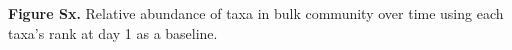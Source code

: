 \textbf{Figure Sx.} Relative abundance of taxa in bulk community over time using each taxa's rank at day 1 as a baseline.  